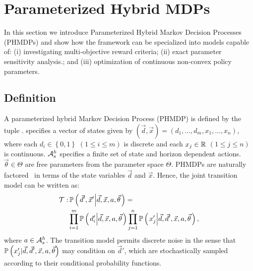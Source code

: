 \section{Parameterized Hybrid MDPs}
\label{sec:hybrid_mdps}

In this section we introduce Parameterized Hybrid Markov Decision Processes (PHMDPs) and show how the framework can be specialized into models capable of: (i) investigating multi-objective reward criteria; (ii) exact parameter sensitivity analysis.; and (iii) optimization of continuous non-convex policy parameters. 

\subsection{Definition}
\label{sec:phmdp_def}

A parameterized hybrid Markov Decision Process (PHMDP) is defined by the tuple {\footnotesize \PMDPTuple}. {\footnotesize \State} specifies a vector of states given by {\footnotesize $(\vec{d}, \vec{x}) =  \left( d_1, \ldots, d_m, x_1, \ldots, x_n \right) $}, where each {\footnotesize $ d_i \in \left\lbrace 0, 1 \right\rbrace $} {\footnotesize $\left( 1 \leq i \leq m \right)$} is discrete and each {\footnotesize$ x_j \in \mathbb{R} $} {\footnotesize $\left( 1 \leq j \leq   n \right)$} is continuous. {\footnotesize $\mathcal{A}^{h}_{s}$} specifies a finite set of state and horizon dependent actions.  {\footnotesize $\vec{\theta} \in \Theta$} are free parameters from the parameter space {\footnotesize $ \Theta $}. PHMDPs are naturally factored~\cite{Boutilier_JAIR_1999} in terms of the state variables {\footnotesize$\vec{d}$} and {\footnotesize
$\vec{x}$}. Hence, the joint transition model can be written as:
{\footnotesize
\abovedisplayskip=0pt
\belowdisplayskip=0pt
\begin{align}
    \label{eq:hmdp_tfunc}
    \mathcal{T} :& \, \mathbb{P}\left({ \left. \vec{d}', \vec{x}' \middle| \vec{d}, \vec{x}, a, \vec{\theta} \right.}\right) = \nonumber \\
    & \prod_{i=1}^{m} \mathbb{P}\left({ \left. d_i' \middle| \vec{d}, \vec{x}, a, \vec{\theta} \right. }\right) \prod_{j=1}^{n} \mathbb{P}\left({ \left. x_j' \middle| \vec{d}, \vec{d}', \vec{x}, a, \vec{\theta} \right. }\right),
\end{align}   
}
where {\footnotesize $ a \in \mathcal{A}^{h}_{s} $}. The transition model permits discrete noise in the sense that {\footnotesize $ \mathbb{P}\left({ x_j' | \vec{d}, \vec{d}', \vec{x}, a, \vec{\theta} }\right) $} may condition on $ \vec{d}' $, which are stochastically sampled according to their conditional probability functions. 

